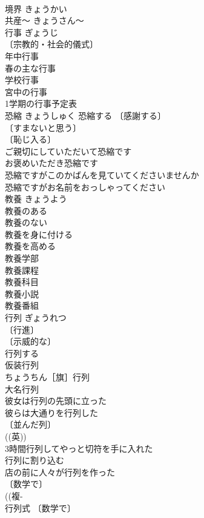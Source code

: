 \documentclass[8pt]{extreport}
\begin{document}
\begin{CJK}{UTF8}{min}
\\	境界	きょうかい	
\\	共産～	きょうさん～	
\\	行事	ぎょうじ	
\\	〔宗教的・社会的儀式〕
\\	年中行事 
\\	春の主な行事 
\\	学校行事 
\\	宮中の行事 
\\	1学期の行事予定表 
\\	恐縮	きょうしゅく	恐縮する 〔感謝する〕
\\	〔すまないと思う〕
\\	〔恥じ入る〕
\\	ご親切にしていただいて恐縮です 
\\	お褒めいただき恐縮です 
\\	恐縮ですがこのかばんを見ていてくださいませんか 
\\	恐縮ですがお名前をおっしゃってください 
\\	教養	きょうよう	
\\	教養のある 
\\	教養のない 
\\	教養を身に付ける 
\\	教養を高める 
\\	教養学部 
\\	教養課程 
\\	教養科目 
\\	教養小説 
\\	教養番組 
\\	行列	ぎょうれつ	
\\	〔行進〕
\\	〔示威的な〕
\\	行列する 
\\	仮装行列 
\\	ちょうちん［旗］行列 
\\	大名行列 
\\	彼女は行列の先頭に立った 
\\	彼らは大通りを行列した 
\\	〔並んだ列〕
\\	((英)) 
\\	3時間行列してやっと切符を手に入れた 
\\	行列に割り込む 
\\	店の前に人々が行列を作った 
\\	〔数学で〕
\\	((複-
\\	行列式 〔数学で〕

\end{CJK}
\end{document}
